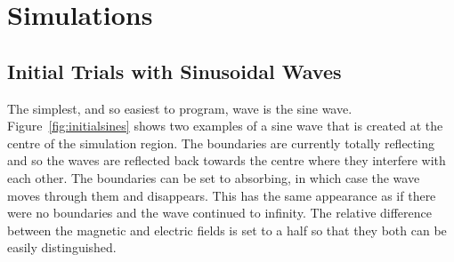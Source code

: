 
\section{Simulations} %
\label{sec:simulations}

\subsection{Initial Trials with Sinusoidal Waves} %
\label{ssub:initial_trials_with_sinusoidal_waves}
The simplest, and so easiest to program, wave is the sine wave. Figure~\ref{fig:initialsines} shows two examples of a sine wave that is created at the centre of the simulation region. The boundaries are currently totally reflecting and so the waves are reflected back towards the centre where they interfere with each other. The boundaries can be set to absorbing, in which case the wave moves through them and disappears. This has the same appearance as if there were no boundaries and the wave continued to infinity. The relative difference between the magnetic and electric fields is set to a half so that they both can be easily distinguished.
